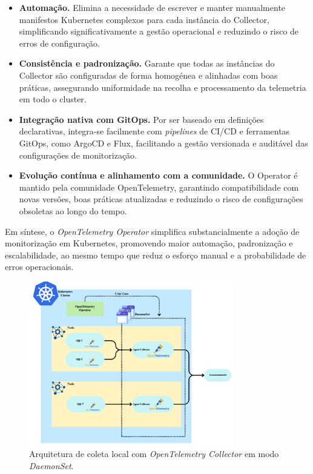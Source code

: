 \begin{itemize}
    \item \textbf{Automação.} Elimina a necessidade de escrever e manter manualmente manifestos Kubernetes complexos para cada instância do Collector, simplificando significativamente a gestão operacional e reduzindo o risco de erros de configuração.

    \item \textbf{Consistência e padronização.} Garante que todas as instâncias do Collector são configuradas de forma homogénea e alinhadas com boas práticas, assegurando uniformidade na recolha e processamento da telemetria em todo o cluster.

    \item \textbf{Integração nativa com GitOps.} Por ser baseado em definições declarativas, integra-se facilmente com \textit{pipelines} de CI/CD e ferramentas GitOps, como ArgoCD e Flux, facilitando a gestão versionada e auditável das configurações de monitorização.

    \item \textbf{Evolução contínua e alinhamento com a comunidade.} O Operator é mantido pela comunidade OpenTelemetry, garantindo compatibilidade com novas versões, boas práticas atualizadas e reduzindo o risco de configurações obsoletas ao longo do tempo.
\end{itemize}


Em síntese, o \textit{OpenTelemetry Operator} simplifica substancialmente a adoção de monitorização em Kubernetes, promovendo maior automação, padronização e escalabilidade, ao mesmo tempo que reduz o esforço manual e a probabilidade de erros operacionais.

\begin{figure}[H]
    \centering
    \includegraphics[width=0.8\textwidth]{images/Diagramas/daemonset_collector.png}
    \caption{Arquitetura de coleta local com \textit{OpenTelemetry Collector} em modo \textit{DaemonSet}.}
    \label{fig:otel-daemonset}
\end{figure}


